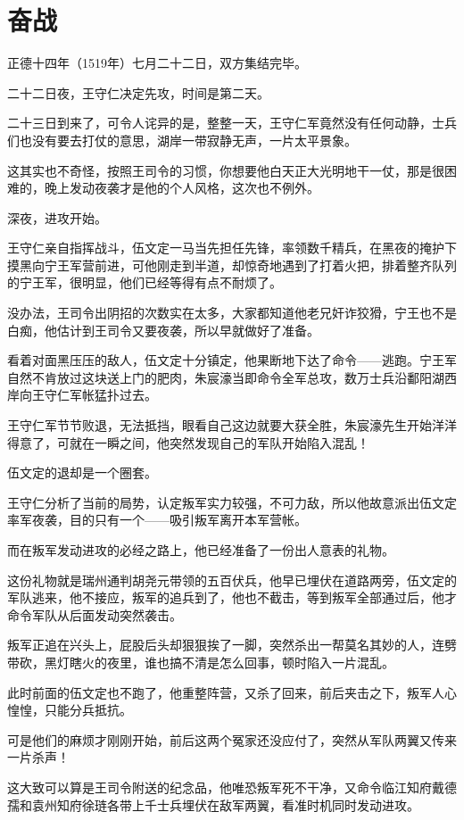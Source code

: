 \section{奋战}
\ifnum{}
	\begin{multicols}{\theparacolNo}
\fi
正德十四年（1519年）七月二十二日，双方集结完毕。

二十二日夜，王守仁决定先攻，时间是第二天。

二十三日到来了，可令人诧异的是，整整一天，王守仁军竟然没有任何动静，士兵们也没有要去打仗的意思，湖岸一带寂静无声，一片太平景象。

这其实也不奇怪，按照王司令的习惯，你想要他白天正大光明地干一仗，那是很困难的，晚上发动夜袭才是他的个人风格，这次也不例外。

深夜，进攻开始。

王守仁亲自指挥战斗，伍文定一马当先担任先锋，率领数千精兵，在黑夜的掩护下摸黑向宁王军营前进，可他刚走到半道，却惊奇地遇到了打着火把，排着整齐队列的宁王军，很明显，他们已经等得有点不耐烦了。

没办法，王司令出阴招的次数实在太多，大家都知道他老兄奸诈狡猾，宁王也不是白痴，他估计到王司令又要夜袭，所以早就做好了准备。

看着对面黑压压的敌人，伍文定十分镇定，他果断地下达了命令——逃跑。宁王军自然不肯放过这块送上门的肥肉，朱宸濠当即命令全军总攻，数万士兵沿鄱阳湖西岸向王守仁军帐猛扑过去。

王守仁军节节败退，无法抵挡，眼看自己这边就要大获全胜，朱宸濠先生开始洋洋得意了，可就在一瞬之间，他突然发现自己的军队开始陷入混乱！

伍文定的退却是一个圈套。

王守仁分析了当前的局势，认定叛军实力较强，不可力敌，所以他故意派出伍文定率军夜袭，目的只有一个——吸引叛军离开本军营帐。

而在叛军发动进攻的必经之路上，他已经准备了一份出人意表的礼物。

这份礼物就是瑞州通判胡尧元带领的五百伏兵，他早已埋伏在道路两旁，伍文定的军队逃来，他不接应，叛军的追兵到了，他也不截击，等到叛军全部通过后，他才命令军队从后面发动突然袭击。

叛军正追在兴头上，屁股后头却狠狠挨了一脚，突然杀出一帮莫名其妙的人，连劈带砍，黑灯瞎火的夜里，谁也搞不清是怎么回事，顿时陷入一片混乱。

此时前面的伍文定也不跑了，他重整阵营，又杀了回来，前后夹击之下，叛军人心惶惶，只能分兵抵抗。

可是他们的麻烦才刚刚开始，前后这两个冤家还没应付了，突然从军队两翼又传来一片杀声！

这大致可以算是王司令附送的纪念品，他唯恐叛军死不干净，又命令临江知府戴德孺和袁州知府徐琏各带上千士兵埋伏在敌军两翼，看准时机同时发动进攻。


\end{multicols}
